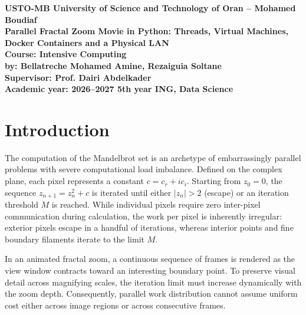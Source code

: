 \documentclass[11pt,a4paper]{article}
\begin{document}
\begin{titlepage}
\centering
\vspace*{2cm}
{\Large \textbf{USTO-MB University of Science and Technology of Oran -- Mohamed Boudiaf}}\\[1.5cm]

{\LARGE \textbf{Parallel Fractal Zoom Movie in Python: Threads, Virtual Machines, Docker Containers and a Physical LAN}}\\[2cm]

{\large \textbf{Course: Intensive Computing}}\\[1.5cm]

{\large \textbf{by: Bellatreche Mohamed Amine, Rezaiguia Soltane}}\\[1.5cm]

{\large \textbf{Supervisor: Prof. Dairi Abdelkader}}\\[1.5cm]

{\large \textbf{Academic year: 2026--2027 5th year ING, Data Science}}\\[2cm]

\vfill
\end{titlepage}

\clearpage

\section{Introduction}
\label{sec:intro}

The computation of the Mandelbrot set is an archetype of embarrassingly parallel problems with severe computational load imbalance. Defined on the complex plane, each pixel represents a constant $c = c_r + i c_i$. Starting from $z_0 = 0$, the sequence $z_{n+1} = z_n^2 + c$ is iterated until either $|z_n| > 2$ (escape) or an iteration threshold $M$ is reached. While individual pixels require zero inter-pixel communication during calculation, the work per pixel is inherently irregular: exterior pixels escape in a handful of iterations, whereas interior points and fine boundary filaments iterate to the limit $M$.

In an animated fractal zoom, a continuous sequence of frames is rendered as the view window contracts toward an interesting boundary point. To preserve visual detail across magnifying scales, the iteration limit must increase dynamically with the zoom depth. Consequently, parallel work distribution cannot assume uniform cost either across image regions or across consecutive frames.
\end{document}
